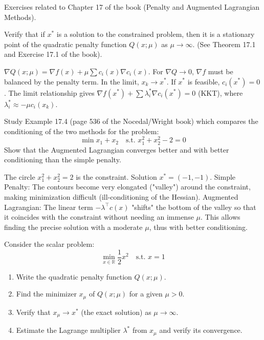 Exercises related to Chapter 17 of the book (Penalty and Augmented Lagrangian Methods).

\bigskip
\begin{exercice}
Verify that if $x^*$ is a solution to the constrained problem, then it is a stationary point of the quadratic penalty function $Q(x; \mu)$ as $\mu \to \infty$. 
(See Theorem 17.1 and Exercise 17.1 of the book).
\end{exercice}

\begin{correction}
$\nabla Q(x; \mu) = \nabla f(x) + \mu \sum c_i(x) \nabla c_i(x)$.
For $\nabla Q \to 0$, $\nabla f$ must be balanced by the penalty term.
In the limit, $x_k \to x^*$.
If $x^*$ is feasible, $c_i(x^*) = 0$.
The limit relationship gives $\nabla f(x^*) + \sum \lambda_i^* \nabla c_i(x^*) = 0$ (KKT), where $\lambda_i^* \approx -\mu c_i(x_k)$.
\end{correction}
\bigskip

\bigskip
\begin{exercice}
Study Example 17.4 (page 536 of the Nocedal/Wright book) which compares the conditioning of the two methods for the problem:
$$ \min x_1 + x_2 \quad \text{s.t. } x_1^2 + x_2^2 - 2 = 0 $$
Show that the Augmented Lagrangian converges better and with better conditioning than the simple penalty.
\end{exercice}

\begin{correction}
The circle $x_1^2 + x_2^2 = 2$ is the constraint. Solution $x^*=(-1,-1)$.
Simple Penalty: The contours become very elongated ("valley") around the constraint, making minimization difficult (ill-conditioning of the Hessian).
Augmented Lagrangian: The linear term $-\lambda^\top c(x)$ "shifts" the bottom of the valley so that it coincides with the constraint without needing an immense $\mu$.
This allows finding the precise solution with a moderate $\mu$, thus with better conditioning.
\end{correction}
\bigskip

\bigskip
\begin{exercice}
Consider the scalar problem:
$$ \min_{x \in \mathbb{R}} \frac{1}{2}x^2 \quad \text{s.t. } x = 1 $$
\begin{enumerate}
    \item Write the quadratic penalty function $Q(x; \mu)$.
    \item Find the minimizer $x_\mu$ of $Q(x; \mu)$ for a given $\mu > 0$.
    \item Verify that $x_\mu \to x^*$ (the exact solution) as $\mu \to \infty$.
    \item Estimate the Lagrange multiplier $\lambda^*$ from $x_\mu$ and verify its convergence.
\end{enumerate}
\end{exercice}

